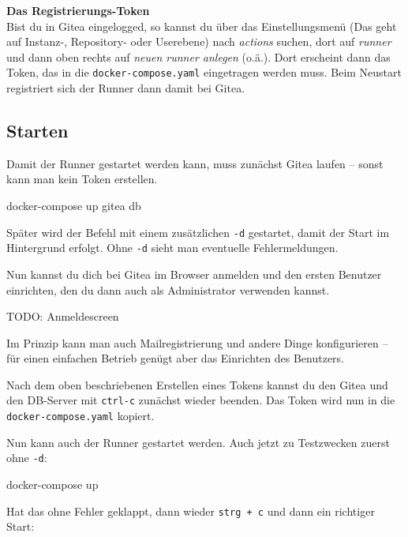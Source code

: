 \documentclass[
  letterpaper,
  DIV=11]{scrreprt}
\newenvironment{Shaded}{\begin{snugshade}}{\end{snugshade}}
\newcommand{\ExtensionTok}[1]{\textcolor[rgb]{0.00,0.23,0.31}{#1}}
\newcommand{\NormalTok}[1]{\textcolor[rgb]{0.00,0.23,0.31}{#1}}
\begin{document}
\textbf{Das Registrierungs-Token}\\
Bist du in Gitea eingelogged, so kannst du über das Einstellungsmenü
(Das geht auf Instanz-, Repository- oder Userebene) nach \emph{actions}
suchen, dort auf \emph{runner} und dann oben rechts auf \emph{neuen
runner anlegen} (o.ä.). Dort erscheint dann das Token, das in die
\texttt{docker-compose.yaml} eingetragen werden muss. Beim Neustart
registriert sich der Runner dann damit bei Gitea.

\subsection{Starten}\label{starten}

Damit der Runner gestartet werden kann, muss zunächst Gitea laufen --
sonst kann man kein Token erstellen.

\begin{Shaded}
\begin{Highlighting}[]
\ExtensionTok{docker{-}compose}\NormalTok{ up gitea db }
\end{Highlighting}
\end{Shaded}

Später wird der Befehl mit einem zusätzlichen \texttt{-d} gestartet,
damit der Start im Hintergrund erfolgt. Ohne \texttt{-d} sieht man
eventuelle Fehlermeldungen.

Nun kannst du dich bei Gitea im Browser anmelden und den ersten Benutzer
einrichten, den du dann auch als Administrator verwenden kannst.

TODO: Anmeldescreen

Im Prinzip kann man auch Mailregistrierung und andere Dinge
konfigurieren -- für einen einfachen Betrieb genügt aber das Einrichten
des Benutzers.

Nach dem oben beschriebenen Erstellen eines Tokens kannst du den Gitea
und den DB-Server mit \texttt{ctrl-c} zunächst wieder beenden. Das Token
wird nun in die \texttt{docker-compose.yaml} kopiert.

Nun kann auch der Runner gestartet werden. Auch jetzt zu Testzwecken
zuerst ohne \texttt{-d}:

\begin{Shaded}
\begin{Highlighting}[]
\ExtensionTok{docker{-}compose}\NormalTok{ up}
\end{Highlighting}
\end{Shaded}

Hat das ohne Fehler geklappt, dann wieder \texttt{strg\ +\ c} und dann
ein richtiger Start:
\end{document}
